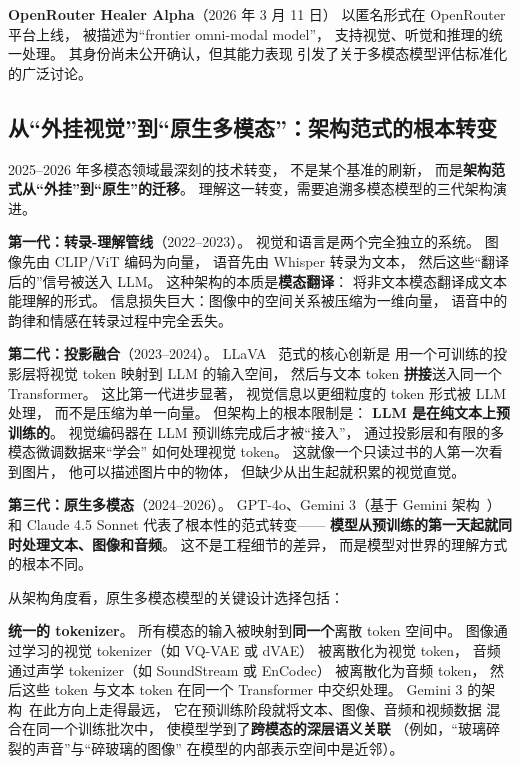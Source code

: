 \textbf{OpenRouter Healer Alpha}（2026 年 3 月 11 日）
以匿名形式在 OpenRouter 平台上线，
被描述为“frontier omni-modal model”，
支持视觉、听觉和推理的统一处理。
其身份尚未公开确认，但其能力表现
引发了关于多模态模型评估标准化的广泛讨论。

\subsection{从“外挂视觉”到“原生多模态”：架构范式的根本转变}

2025--2026 年多模态领域最深刻的技术转变，
不是某个基准的刷新，
而是\textbf{架构范式从“外挂”到“原生”的迁移}。
理解这一转变，需要追溯多模态模型的三代架构演进。

\textbf{第一代：转录-理解管线}（2022--2023）。
视觉和语言是两个完全独立的系统。
图像先由 CLIP/ViT 编码为向量，
语音先由 Whisper 转录为文本，
然后这些“翻译后的”信号被送入 LLM。
这种架构的本质是\textbf{模态翻译}：
将非文本模态翻译成文本能理解的形式。
信息损失巨大：图像中的空间关系被压缩为一维向量，
语音中的韵律和情感在转录过程中完全丢失。

\textbf{第二代：投影融合}（2023--2024）。
LLaVA~\cite{liu2023llava} 范式的核心创新是
用一个可训练的投影层将视觉 token 映射到 LLM 的输入空间，
然后与文本 token \textbf{拼接}送入同一个 Transformer。
这比第一代进步显著，
视觉信息以更细粒度的 token 形式被 LLM 处理，
而不是压缩为单一向量。
但架构上的根本限制是：
\textbf{LLM 是在纯文本上预训练的}。
视觉编码器在 LLM 预训练完成后才被“接入”，
通过投影层和有限的多模态微调数据来“学会”
如何处理视觉 token。
这就像一个只读过书的人第一次看到图片，
他可以描述图片中的物体，
但缺少从出生起就积累的视觉直觉。

\textbf{第三代：原生多模态}（2024--2026）。
GPT-4o、Gemini 3（基于 Gemini 架构~\cite{anil2023gemini}）
和 Claude 4.5 Sonnet 代表了根本性的范式转变——
\textbf{模型从预训练的第一天起就同时处理文本、图像和音频}。
这不是工程细节的差异，
而是模型对世界的理解方式的根本不同。

从架构角度看，原生多模态模型的关键设计选择包括：

\textbf{统一的 tokenizer}。
所有模态的输入被映射到\textbf{同一个}离散 token 空间中。
图像通过学习的视觉 tokenizer（如 VQ-VAE 或 dVAE）
被离散化为视觉 token，
音频通过声学 tokenizer（如 SoundStream 或 EnCodec）
被离散化为音频 token，
然后这些 token 与文本 token
在同一个 Transformer 中交织处理。
Gemini 3 的架构~\cite{anil2023gemini}在此方向上走得最远，
它在预训练阶段就将文本、图像、音频和视频数据
混合在同一个训练批次中，
使模型学到了\textbf{跨模态的深层语义关联}
（例如，“玻璃碎裂的声音”与“碎玻璃的图像”
在模型的内部表示空间中是近邻）。

